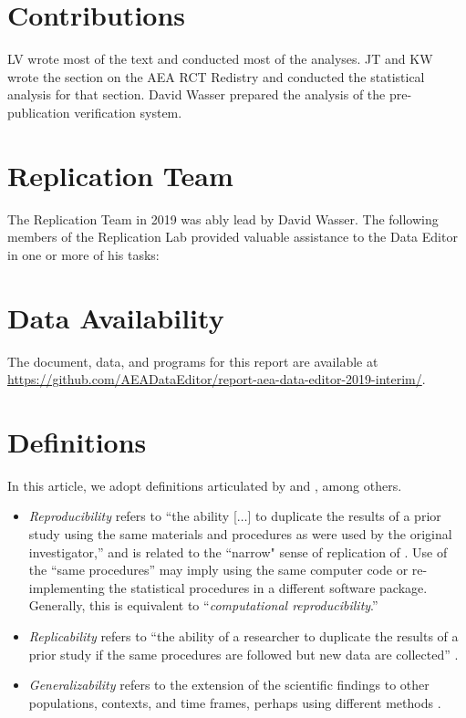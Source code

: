 \section{Contributions}

LV wrote most of the text and conducted most of the analyses. JT and KW wrote the section on the AEA RCT Redistry and conducted the statistical analysis for that section. David Wasser prepared the analysis of the pre-publication verification system.

\section{Replication Team}
The Replication Team in 2019 was ably lead by David Wasser. The following members of the Replication Lab provided valuable assistance to the Data Editor in one or more of his tasks:

\csvreader[/csv/head=true,%
/csv/head to column names=true,%
/csv/late after line={,},%
/csv/late after last line=.,%
]%
{data/replicationlab_members.txt}{}{ \first \xspace \initial \xspace \last }

\section{Data Availability}
The document, data, and programs for this report are available at \url{https://github.com/AEADataEditor/report-aea-data-editor-2019-interim/}.

\section{Definitions}
In this article, we adopt  definitions articulated by \citet{Bollen2015} and \citet{NationalAcademiesofSciencesEngineeringandMedicine2019}, among others. 
\begin{itemize}
	\item \textit{Reproducibility}  refers to ``the ability [$\dots$] to duplicate the results of a prior study using the same materials and procedures as were used by the original investigator,'' and is related to the ``narrow" sense of replication of \cite{PesaranJ.Appl.Econom.2003}. Use of the ``same procedures'' may imply using the same computer code or re-implementing the statistical procedures in a different software package. Generally, this is equivalent to ``\textit{computational reproducibility}.''  
	\item \textit{Replicability} refers to ``the ability of a researcher to duplicate the results of a prior study if the same procedures are followed but new data are collected'' \citep[ ``wider'' sense of replication]{PesaranJ.Appl.Econom.2003}.
	\item \textit{Generalizability} refers to the extension of the scientific findings to other populations, contexts, and time frames, perhaps using different methods \citep[ ``scientific replication'']{Hamermesh2017-kq}.
	
\end{itemize}

